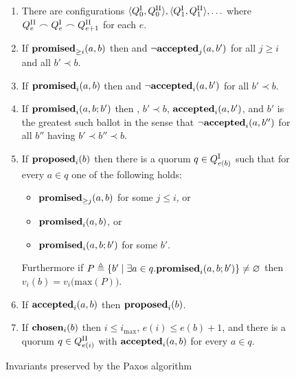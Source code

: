 \documentclass[journal]{IEEEtran}
\begin{document}
\begin{figure*} \caption{Invariants preserved by the Paxos
  algorithm\label{paxos-invariants-figure}}

\vspace{3mm}

\renewcommand{\theenumi}{P\arabic{enumi}}

\begin{enumerate}

\item\label{paxos-quorums} There are configurations $\langle {Q}^\textrm{I}_{0}, {Q}^\textrm{II}_{0}
  \rangle, \langle {Q}^\textrm{I}_{1}, {Q}^\textrm{II}_{1} \rangle, \ldots$ where ${{Q}^\textrm{II}_{e} \frown
  {Q}^\textrm{I}_{e} \frown {Q}^\textrm{II}_{e+1}}$ for each $e$.

\item\label{paxos-mprom} If $\mathbf{promised}_{\ge i}(a,b)$ then \promiseEraOk and
  $\neg\mathbf{accepted}_{j}(a,b')$ for all $j \ge i$ and all $b' \prec b$.

\item\label{paxos-fprom} If $\mathbf{promised}_{i}(a,b)$ then \promiseEraOk and
  $\neg\mathbf{accepted}_{i}(a,b')$ for all $b' \prec b$.

\item\label{paxos-bprom} If $\mathbf{promised}_{i}(a,b;b')$ then \promiseEraOk, $b'
  \prec b$, $\mathbf{accepted}_{i}(a,b')$, and $b'$ is the greatest such ballot in the sense
  that $\neg \mathbf{accepted}_{i}(a,b'')$ for all $b''$ having $b' \prec b'' \prec b$.

\item\label{paxos-prop} If $\mathbf{proposed}_{i}(b)$ then there is a quorum $q \in
  {Q}^\textrm{I}_{e(b)}$ such that for every $a \in q$ one of the following holds:
%
\begin{itemize}
\item $\mathbf{promised}_{\ge j}(a,b)$ for some $j \le i$, or
\item $\mathbf{promised}_{i}(a,b)$, or
\item $\mathbf{promised}_{i}(a,b;b')$ for some $b'$.
\end{itemize}
%
Furthermore if $P \triangleq \{ b' \mid \exists a \in q. \mathbf{promised}_{i}(a,b;b') \}
\ne \varnothing$ then $v_i(b) = v_i\bigl(\mathrm{max}(P)\bigr)$.

\item \label{paxos-acc} If $\mathbf{accepted}_{i}(a,b)$ then $\mathbf{proposed}_{i}(b)$.

\item \label{paxos-chosen} If $\mathbf{chosen}_{i}(b)$ then $i \le i_\mathrm{max}$,
  $e(i) \le e(b) + 1$, and there is a quorum $q \in {Q}^\textrm{II}_{e(i)}$ with
  $\mathbf{accepted}_{i}(a,b)$ for every $a \in q$.

\end{enumerate}

\end{figure*}
\end{document}
